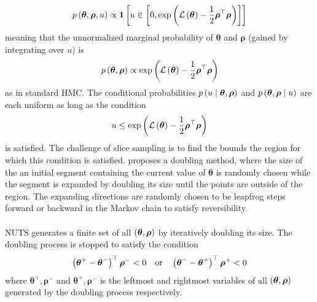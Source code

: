 \begin{equation*}
    p \left (\boldsymbol{\theta}, \boldsymbol{\rho}, u\right) \propto \mathbf{1} \left [ u \in \left [0,\exp{\left(\mathcal{L} \left (\boldsymbol{\theta}\right) - \frac{1}{2} \boldsymbol{\rho}^\top \boldsymbol{\rho}\right)} \right] \right]
\end{equation*}
meaning that the unnormalized marginal probability of $\boldsymbol{\theta}$ and $\boldsymbol{\rho}$ (gained by integrating over $u$) is 
\begin{equation*}
    p \left (\boldsymbol{\theta}, \boldsymbol{\rho}\right) \propto \exp{\left(\mathcal{L} \left (\boldsymbol{\theta}\right) - \frac{1}{2} \boldsymbol{\rho}^\top \boldsymbol{\rho}\right)}
\end{equation*}
as in standard HMC. The conditional probabilities $p \left (u \mid \boldsymbol{\theta}, \boldsymbol{\rho}\right)$ and $p \left (\boldsymbol{\theta}, \boldsymbol{\rho} \mid u\right)$ are each uniform as long as the condition 
\begin{equation} \label{eq:nuts_unif_condition}
    u \leq \exp{\left(\mathcal{L} \left (\boldsymbol{\theta}\right) - \frac{1}{2} \boldsymbol{\rho}^\top \boldsymbol{\rho}\right)}
\end{equation}
is satisfied. The challenge of slice sampling is to find the bounds the region for which this condition is satisfied. \cite{neal_slice_sampling} proposes a doubling method, where the size of the an initial segment containing the current value of $\boldsymbol{\theta}$ is randomly chosen while the segment is expanded by doubling its size until the points are outside of the region. The expanding directions are randomly chosen to be leapfrog steps forward or backward in the Markov chain to satisfy reversibility.
\\
\\
NUTS generates a finite set of all $\left (\boldsymbol{\theta}, \boldsymbol{\rho}\right)$ by iteratively doubling its size. The doubling process is stopped to satisfy the condition 
\begin{equation*}
    \left (\boldsymbol{\theta}^+ - \boldsymbol{\theta}^-\right)^\top \boldsymbol{\rho}^- < 0 \quad \text{or} \quad \left (\boldsymbol{\theta}^- - \boldsymbol{\theta}^+\right)^\top \boldsymbol{\rho}^+ < 0
\end{equation*}
where $\boldsymbol{\theta}^+, \boldsymbol{\rho}^-$ and $\boldsymbol{\theta}^+, \boldsymbol{\rho}^-$ is the leftmost and rightmost variables of all $\left (\boldsymbol{\theta}, \boldsymbol{\rho}\right)$ generated by the doubling process respectively. 
\\
\\
